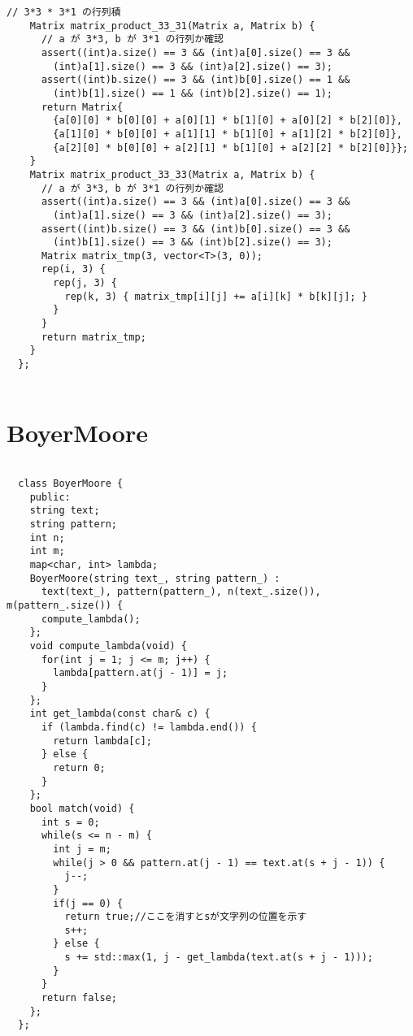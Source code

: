 \documentclass{jsarticle}
\begin{document}
\begin{lstlisting}[caption=AffineMap]
    // 3*3 * 3*1 の行列積
    Matrix matrix_product_33_31(Matrix a, Matrix b) {
      // a が 3*3, b が 3*1 の行列か確認
      assert((int)a.size() == 3 && (int)a[0].size() == 3 &&
        (int)a[1].size() == 3 && (int)a[2].size() == 3);
      assert((int)b.size() == 3 && (int)b[0].size() == 1 &&
        (int)b[1].size() == 1 && (int)b[2].size() == 1);
      return Matrix{
        {a[0][0] * b[0][0] + a[0][1] * b[1][0] + a[0][2] * b[2][0]},
        {a[1][0] * b[0][0] + a[1][1] * b[1][0] + a[1][2] * b[2][0]},
        {a[2][0] * b[0][0] + a[2][1] * b[1][0] + a[2][2] * b[2][0]}};
    }
    Matrix matrix_product_33_33(Matrix a, Matrix b) {
      // a が 3*3, b が 3*1 の行列か確認
      assert((int)a.size() == 3 && (int)a[0].size() == 3 &&
        (int)a[1].size() == 3 && (int)a[2].size() == 3);
      assert((int)b.size() == 3 && (int)b[0].size() == 3 &&
        (int)b[1].size() == 3 && (int)b[2].size() == 3);
      Matrix matrix_tmp(3, vector<T>(3, 0));
      rep(i, 3) {
        rep(j, 3) {
          rep(k, 3) { matrix_tmp[i][j] += a[i][k] * b[k][j]; }
        }
      }
      return matrix_tmp;
    }
  };
  

\end{lstlisting}

\color{white}
\section{BoyerMoore}
\color{black}
\begin{lstlisting}[caption=BoyerMoore]

  class BoyerMoore {
    public:
    string text;
    string pattern;
    int n;
    int m;
    map<char, int> lambda;
    BoyerMoore(string text_, string pattern_) : 
      text(text_), pattern(pattern_), n(text_.size()), m(pattern_.size()) {
      compute_lambda();
    };
    void compute_lambda(void) {
      for(int j = 1; j <= m; j++) {
        lambda[pattern.at(j - 1)] = j;
      }
    };
    int get_lambda(const char& c) {
      if (lambda.find(c) != lambda.end()) {
        return lambda[c];
      } else {
        return 0;
      }
    };
    bool match(void) {
      int s = 0;
      while(s <= n - m) {
        int j = m;
        while(j > 0 && pattern.at(j - 1) == text.at(s + j - 1)) {
          j--;
        }
        if(j == 0) {
          return true;//ここを消すとsが文字列の位置を示す
          s++;
        } else {
          s += std::max(1, j - get_lambda(text.at(s + j - 1)));
        }
      }
      return false;
    };
  };
  

\end{lstlisting}
\end{document}
